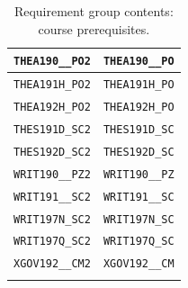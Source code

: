 \begin{longtable}{|p{4.4in}|p{4.4in}|}
    \verb|THEA190__PO2| & \verb|THEA190__PO|\\\hline
    \verb|THEA191H_PO2| & \verb|THEA191H_PO|\\\hline
    \verb|THEA192H_PO2| & \verb|THEA192H_PO|\\\hline
    \verb|THES191D_SC2| & \verb|THES191D_SC|\\\hline
    \verb|THES192D_SC2| & \verb|THES192D_SC|\\\hline
    \verb|WRIT190__PZ2| & \verb|WRIT190__PZ|\\\hline
    \verb|WRIT191__SC2| & \verb|WRIT191__SC|\\\hline
    \verb|WRIT197N_SC2| & \verb|WRIT197N_SC|\\\hline
    \verb|WRIT197Q_SC2| & \verb|WRIT197Q_SC|\\\hline
    \verb|XGOV192__CM2| & \verb|XGOV192__CM|\\\hline
    \caption{Requirement group contents: course prerequisites.}
    \label{tab:reqs-prereqs}
\end{longtable}
